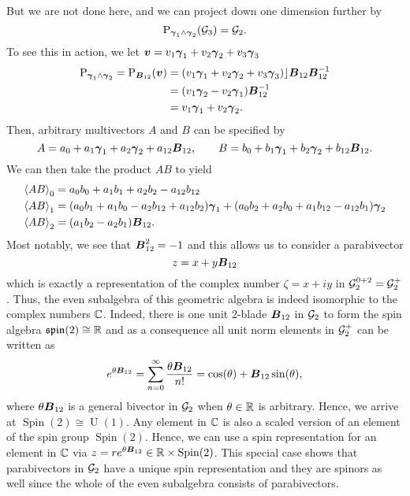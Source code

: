 But we are not done here, and we can project down one dimension further by
\begin{equation}
    \projection_{\blade{\gamma}_1 \wedge \blade{\gamma}_2} (\G_3) = \G_2.
\end{equation}
To see this in action, we let $\blade{v}=v_1 \blade{\gamma}_1 + v_2 \blade{\gamma}_2 + v_3 \blade{\gamma}_3$
\begin{subequations}
\begin{align}
    \projection_{\blade{\gamma}_1 \wedge \blade{\gamma}_2} = \projection_{\blade{B}_{12}} (\blade{v}) &= (v_1 \blade{\gamma}_1 + v_2 \blade{\gamma}_2 + v_3 \blade{\gamma}_3)\rfloor \blade{B}_{12}\blade{B}_{12}^{-1}\\
    &= (v_1 \blade{\gamma}_2 - v_2 \blade{\gamma}_1)\blade{B}_{12}^{-1} \\
    &= v_1 \blade{\gamma}_1 + v_2 \blade{\gamma}_2.
\end{align}
\end{subequations}
Then, arbitrary multivectors $A$ and $B$ can be specified by
\[
A = a_0 + a_1 \blade{\gamma}_1 + a_2 \blade{\gamma}_2 + a_{12} \blade{B}_{12}, \qquad B = b_0 +b_1 \blade{\gamma}_1 + b_2 \blade{\gamma}_2 + b_{12}\blade{B}_{12}.
\]
We can then take the product $AB$ to yield
\begin{subequations}
\begin{align}
\proj{0}{AB} &= a_0b_0 + a_1 b_1 + a_2 b_2 - a_{12}b_{12}\\
\proj{1}{AB} &= (a_0 b_1 + a_1 b_0 - a_2 b_{12} + a_{12} b_2) \blade{\gamma}_1 + (a_0 b_2 + a_2 b_0 + a_1b_{12} - a_{12} b_1) \blade{\gamma}_2\\
\proj{2}{AB} &= (a_1b_2 - a_2 b_1)\blade{B}_{12}.
\end{align}
\end{subequations}
Most notably, we see that $\blade{B}_{12}^2=-1$ and this allows us to consider a parabivector
\begin{equation}
z = x + y \blade{B}_{12}
\end{equation}
which is exactly a representation of the complex number $\zeta = x+ iy$ in $\G_2^{0+2}=\G_2^+$.  Thus, the even subalgebra of this geometric algebra is indeed isomorphic to the complex numbers $\C$. Indeed, there is one unit 2-blade $\blade{B}_{12}$ in $\G_2$ to form the spin algebra $\mathfrak{spin}(2) \cong \R$ and as a consequence all unit norm elements in $\G_2^+$ can be written as
\begin{equation}
   e^{\theta \blade{B}_{12}} = \sum_{n=0}^\infty \frac{\theta \blade{B}_{12}}{n!} = \cos(\theta)+\blade{B}_{12}\sin(\theta),
\end{equation}
where $\theta \blade{B}_{12}$ is a general bivector in $\G_2$ when $\theta \in \R$ is arbitrary. Hence, we arrive at $\operatorname{Spin}(2)\cong \operatorname{U}(1)$. Any element in $\C$ is also a scaled version of an element of the spin group $\operatorname{Spin}(2)$. Hence, we can use a spin representation for an element in $\C$ via $z=re^{\theta \blade{B}_{12}} \in \R\times \operatorname{Spin}(2)$.  This special case shows that parabivectors in $\G_2$ have a unique spin representation and they are spinors as well since the whole of the even subalgebra consists of parabivectors.

